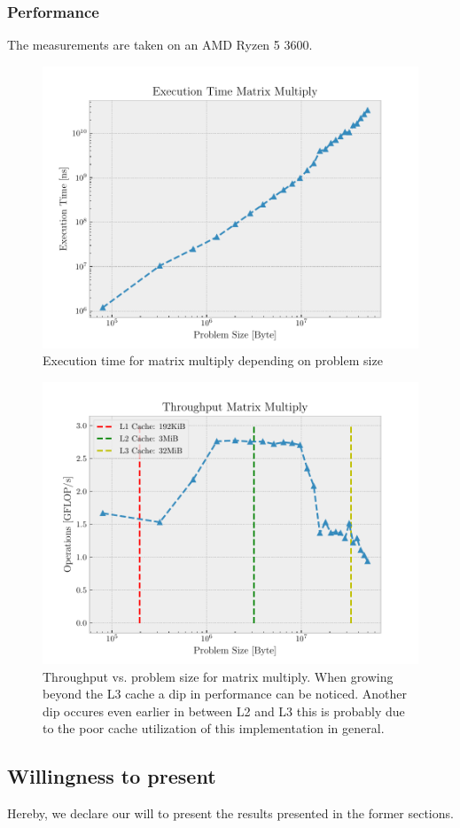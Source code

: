 \documentclass[12pt]{article}
\begin{document}
\subsubsection{Performance}
The measurements are taken on an AMD Ryzen 5 3600.
\begin{figure}[htpb]
	\centering
	\includegraphics[width=1\linewidth]{../eval/mmul_time.pdf}
	\caption{Execution time for matrix multiply depending on problem size}%
	\label{fig:../eval/mmul_time}
\end{figure}
\begin{figure}[htpb]
	\centering
	\includegraphics[width=1\linewidth]{../eval/mmul_through.pdf}
	\caption{Throughput vs. problem size for matrix multiply. When growing beyond the L3 cache a dip in performance can be noticed. Another dip occures even earlier in between L2 and L3 this is probably due to the poor cache utilization of this implementation in general.}%
	\label{fig:../eval/mmul_through}
\end{figure}

\newpage
\subsection{Willingness to present}
Hereby, we declare our will to present the results presented in the former sections.
\end{document}
